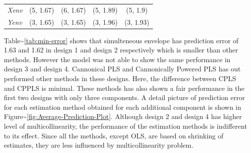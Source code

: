 \documentclass[12pt,A4paper,authoryear]{elsarticle} %
\theoremstyle{definition}
\theoremstyle{definition}
\theoremstyle{remark}
\begin{document}
\begin{longtable}[]{@{}lcccc@{}}
\begin{minipage}[t]{0.10\columnwidth}
\emph{Xenv}\strut
\end{minipage} & \begin{minipage}[t]{0.19\columnwidth}\centering\strut
(5, 1.67)\strut
\end{minipage} & \begin{minipage}[t]{0.19\columnwidth}\centering\strut
(6, 1.67)\strut
\end{minipage} & \begin{minipage}[t]{0.19\columnwidth}\centering\strut
(5, 1.89)\strut
\end{minipage} & \begin{minipage}[t]{0.19\columnwidth}\centering\strut
(5, 1.9)\strut
\end{minipage}\tabularnewline
\begin{minipage}[t]{0.10\columnwidth}\raggedright\strut
\emph{Yenv}\strut
\end{minipage} & \begin{minipage}[t]{0.19\columnwidth}\centering\strut
(3, 1.65)\strut
\end{minipage} & \begin{minipage}[t]{0.19\columnwidth}\centering\strut
(3, 1.65)\strut
\end{minipage} & \begin{minipage}[t]{0.19\columnwidth}\centering\strut
(3, 1.96)\strut
\end{minipage} & \begin{minipage}[t]{0.19\columnwidth}\centering\strut
(3, 1.93)\strut
\end{minipage}\tabularnewline
\bottomrule
\end{longtable}

Table\textasciitilde{}\ref{tab:min-error} shows that simulteneous
envelope has prediction error of 1.63 and 1.62 in design 1 and design 2
respectively which is smaller than other methods. However the model was
not able to show the same performance in design 3 and design 4.
Cannonical PLS and Cannonically Powered PLS has out performed other
methods in these designs. Here, the difference between CPLS and CPPLS is
minimal. These methods has also shown a fair performance in the first
two designs with only three components. A detail picture of prediction
error for each estimation method obtained for each additional component
is shown in Figure\textasciitilde{}\ref{fig:Average-Prediction-Plot}.
Although design 2 and design 4 has higher level of multicollinearity,
the performance of the estimation methods is indifferent to its effect.
Since all the methods, except OLS, are based on shrinking of estimates,
they are less influenced by multicollinearity problem.
\end{document}

